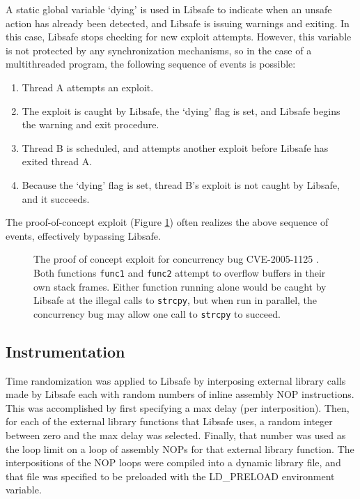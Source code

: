 \documentclass[letterpaper,twocolumn,10pt]{article}
\begin{document}
A static global variable `dying' is used in Libsafe to indicate when an unsafe action has already been detected, and Libsafe is issuing warnings and exiting.  In this case, Libsafe stops checking for new exploit attempts.  However, this variable is not protected by any synchronization mechanisms, so in the case of a multithreaded program, the following sequence of events is possible:
\begin{enumerate}
	\item Thread A attempts an exploit.
	\item The exploit is caught by Libsafe, the `dying' flag is set, and Libsafe begins the warning and exit procedure.
	\item Thread B is scheduled, and attempts another exploit before Libsafe has exited thread A.
	\item Because the `dying' flag is set, thread B's exploit is not caught by Libsafe, and it succeeds.
\end{enumerate}
The proof-of-concept exploit (Figure \ref{fig_poc}) often realizes the above sequence of events, effectively bypassing Libsafe.
\begin{figure}

\caption{The proof of concept exploit for concurrency bug CVE-2005-1125 \cite{CVE2005-1125}.  Both functions \texttt{func1} and \texttt{func2} attempt to overflow buffers in their own stack frames.  Either function running alone would be caught by Libsafe at the illegal calls to \texttt{strcpy}, but when run in parallel, the concurrency bug may allow one call to \texttt{strcpy} to succeed.}
\label{fig_poc}
\end{figure}
\subsection{Instrumentation \cite{Conrad2009}}
Time randomization was applied to Libsafe by interposing external library calls made by Libsafe each with random numbers of inline assembly NOP instructions.  This was accomplished by first specifying a max delay (per interposition).  Then, for each of the external library functions that Libsafe uses, a random integer between zero and the max delay was selected.  Finally, that number was used as the loop limit on a loop of assembly NOPs for that external library function.  The interpositions of the NOP loops were compiled into a dynamic library file, and that file was specified to be preloaded with the LD\_PRELOAD environment variable.
\end{document}
